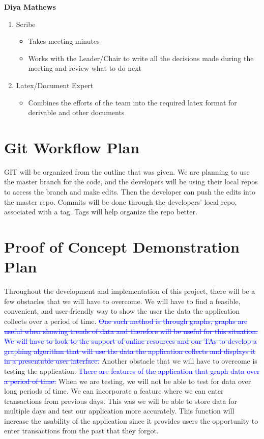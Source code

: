 \documentclass{article}
\begin{document}
\vspace{5mm}

\textbf{Diya Mathews}
\begin{enumerate}
  \item Scribe
  \begin{itemize}
    \item Takes meeting minutes
    \item Works with the Leader/Chair to write all the decisions made during the meeting and review what to do next
  \end{itemize}
  \item Latex/Document Expert
  \begin{itemize}
    \item Combines the efforts of the team into the required latex format for derivable and other documents
  \end{itemize}
\end{enumerate}

\section{Git Workflow Plan}
GIT will be organized from the outline that was given. We are planning to use the master branch for the code, and the developers will be using their local repos to access the branch and make edits. Then the developer can push the edits into the master repo. Commits will be done through the developers’ local repo, associated with a tag. Tags will help organize the repo better.

\section{Proof of Concept Demonstration Plan}
Throughout the development and implementation of this project, there will be a few obstacles that we will have to overcome. We will have to find a feasible, convenient, and user-friendly way to show the user the data the application collects over a period of time. \textcolor{blue}{\st{One such method is through graphs, graphs are useful when showing trends of data and therefore will be useful for this situation. We will have to look to the support of online resources and our TAs to develop a graphing algorithm that will use the data the application collects and displays it in a presentable user interface.}} Another obstacle that we will have to overcome is testing the application. \textcolor{blue}{\st{There are features of the application that graph data over a period of time.}} When we are testing, we will not be able to test for data over long periods of time. We can incorporate a feature where we can enter transactions from previous days. This was we will be able to store data for multiple days and test our application more accurately. This function will increase the usability of the application since it provides users the opportunity to enter transactions from the past that they forgot.
\end{document}
